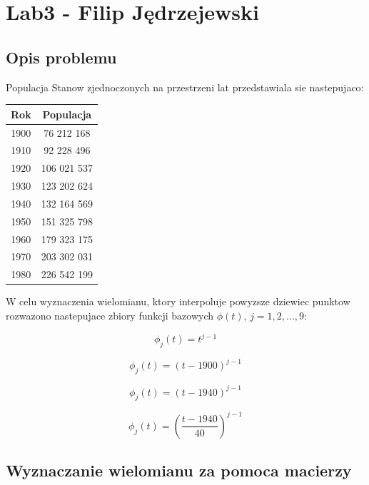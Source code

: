 \documentclass{article}
\begin{document}
	\section*{Lab3 - Filip Jędrzejewski}
	
	\subsection*{Opis problemu}
	
	Populacja Stanow zjednoczonych na przestrzeni lat przedstawiala sie nastepujaco:
	
	\begin{center}
		\begin{tabular}{c|c}
  			\hline 
  			Rok & Populacja\\
  			\hline
  			1900 & 76 212 168 \\
  			1910 & 92 228 496 \\
  			1920 & 106 021 537 \\
  			1930 & 123 202 624 \\
  			1940 & 132 164 569 \\
  			1950 & 151 325 798 \\
  			1960 & 179 323 175 \\
  			1970 & 203 302 031 \\
  			1980 & 226 542 199 \\
		\end{tabular} 
		
	\end{center}
	
	W celu wyznaczenia wielomianu, ktory interpoluje powyzsze dziewiec punktow rozwazono nastepujace zbiory funkcji bazowych $\phi (t)$, $j=1,2,...,9$:
	
	\begin{equation}
		\phi_j (t) = t^{j-1}
	\end{equation}
	
	\begin{equation}
		\phi_j (t) = (t-1900)^{j-1}
	\end{equation}
	
	\begin{equation}
		\phi_j (t) = (t-1940)^{j-1}
	\end{equation}
	
	\begin{equation}
		\phi_j (t) = \left(\frac{t-1940}{40}\right)^{j-1}
	\end{equation}
	
	\subsection*{Wyznaczanie wielomianu za pomoca macierzy}
	
\end{document}
